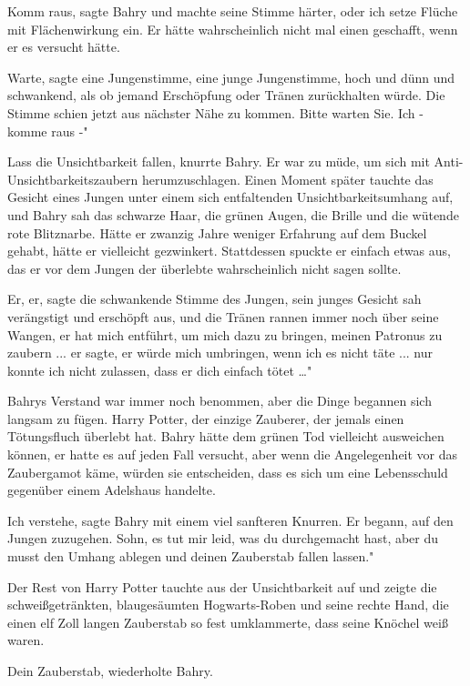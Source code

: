 \glqq Komm raus\grqq{}, sagte Bahry und machte seine Stimme härter, \glqq oder
ich setze Flüche mit Flächenwirkung ein.\grqq{} Er hätte wahrscheinlich nicht
mal einen geschafft, wenn er es versucht hätte.

\glqq Warte\grqq{}, sagte eine Jungenstimme, eine junge Jungenstimme, hoch und
dünn und schwankend, als ob jemand Erschöpfung oder Tränen zurückhalten würde.
Die Stimme schien jetzt aus nächster Nähe zu kommen. \glqq Bitte warten Sie. Ich
- komme raus -"

\glqq Lass die Unsichtbarkeit fallen\grqq{}, knurrte Bahry. Er war zu müde, um
sich mit Anti-Unsichtbarkeitszaubern herumzuschlagen. Einen Moment später
tauchte das Gesicht eines Jungen unter einem sich entfaltenden
Unsichtbarkeitsumhang auf, und Bahry sah das schwarze Haar, die grünen Augen,
die Brille und die wütende rote Blitznarbe. Hätte er zwanzig Jahre weniger
Erfahrung auf dem Buckel gehabt, hätte er vielleicht gezwinkert. Stattdessen
spuckte er einfach etwas aus, das er vor dem Jungen der überlebte wahrscheinlich
nicht sagen sollte.

\glqq Er, er\grqq{}, sagte die schwankende Stimme des Jungen, sein junges
Gesicht sah verängstigt und erschöpft aus, und die Tränen rannen immer noch über
seine Wangen, \glqq er hat mich entführt, um mich dazu zu bringen, meinen
Patronus zu zaubern ... er sagte, er würde mich umbringen, wenn ich es nicht
täte ... nur konnte ich nicht zulassen, dass er dich einfach tötet …"

Bahrys Verstand war immer noch benommen, aber die Dinge begannen sich langsam zu
fügen. Harry Potter, der einzige Zauberer, der jemals einen Tötungsfluch
überlebt hat. Bahry hätte dem grünen Tod vielleicht ausweichen können, er hatte
es auf jeden Fall versucht, aber wenn die Angelegenheit vor das Zaubergamot
käme, würden sie entscheiden, dass es sich um eine Lebensschuld gegenüber einem
Adelshaus handelte.

\glqq Ich verstehe\grqq{}, sagte Bahry mit einem viel sanfteren Knurren. Er
begann, auf den Jungen zuzugehen. \glqq Sohn, es tut mir leid, was du
durchgemacht hast, aber du musst den Umhang ablegen und deinen Zauberstab fallen
lassen."

Der Rest von Harry Potter tauchte aus der Unsichtbarkeit auf und zeigte die
schweißgetränkten, blaugesäumten Hogwarts-Roben und seine rechte Hand, die einen
elf Zoll langen Zauberstab so fest umklammerte, dass seine Knöchel weiß waren.

\glqq Dein Zauberstab\grqq{}, wiederholte Bahry.

